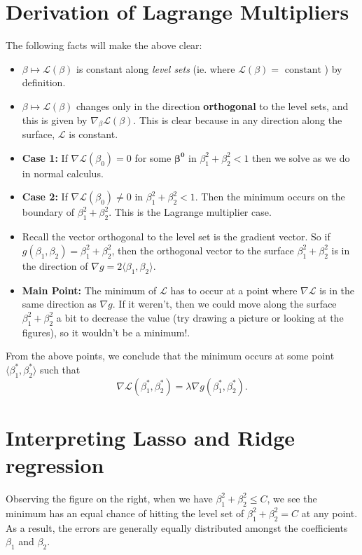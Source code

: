 \documentclass[paper=a4, fontsize=11pt]{scrartcl} %
\numberwithin{equation}{section} %
\numberwithin{figure}{section} %
\numberwithin{table}{section} %
\begin{document}
\section{Derivation of Lagrange Multipliers}

The following facts will make the above clear:
\begin{itemize}
\item $ \beta \mapsto \mathcal{L}(\beta)$ is constant along \emph{level sets} (ie. where $\mathcal{L}(\beta) = \textrm{ constant } $) by definition.
\item $ \beta \mapsto \mathcal{L}(\beta)$ changes only in the direction \textbf{orthogonal} to the level sets, and this is given by $\nabla_{\beta} \mathcal{L}(\beta)$. This is clear because
in any direction along the surface, $\mathcal{L}$ is constant. 

\item \textbf{Case 1:} If $\nabla \mathcal{L}(\beta_0) = 0$ for some $\mathbf{\beta^0}$ in $\beta_1^2 + \beta_2^2 < 1$ then we solve as we do in normal calculus. 
\item  \textbf{Case 2:} If $\nabla \mathcal{L}(\beta_0) \neq 0$ in $\beta_1^2 + \beta_2^2 < 1$. Then the minimum occurs on the boundary of $\beta_1^2 + \beta_2^2$. This is the Lagrange multiplier case.
\item Recall the vector orthogonal to the level set is the gradient vector. So if $g(\beta_1,\beta_2) = \beta_1^2 + \beta_2^2$, then the orthogonal vector to the surface $\beta_1^2 + \beta_2^2$ is in the direction
of $\nabla g = 2\langle \beta_1, \beta_2 \rangle$.
\item \textbf{Main Point:} The minimum of $\mathcal{L}$ has to occur at a point where $\nabla \mathcal {L}$ is in the same direction as $\nabla g$. If it weren't, then we could move along the surface $\beta_1^2 + \beta_2^2$ a bit
to decrease the value (try drawing a picture or looking at the figures), so it wouldn't be a minimum!.
\end{itemize}

From the above points, we conclude that the minimum occurs at some point $\langle \beta_1^*, \beta_2^* \rangle$ such that
\[ \nabla \mathcal{L}(\beta_1^*, \beta_2^*) = \lambda \nabla g(\beta_1^*, \beta_2^*). \]

\section{Interpreting Lasso and Ridge regression}

Observing the figure on the right, when we have $\beta_1^2 + \beta_2^2 \leq C$, we see the minimum has an equal chance of hitting the level set of $\beta_1^2 + \beta_2^2 = C$ at any point. As a result,
the errors are generally equally distributed amongst the coefficients $\beta_1$ and $\beta_2$.\\\\
\end{document}
